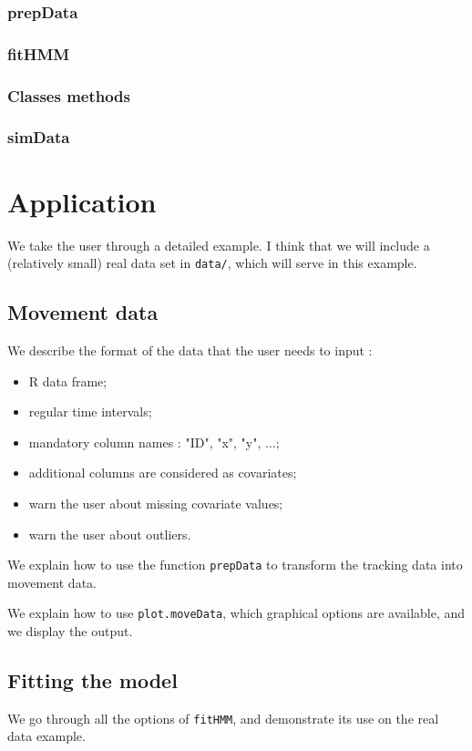 \documentclass[]{article}
\begin{document}
\subsubsection{prepData}

\subsubsection{fitHMM}

\subsubsection{Classes methods}

\subsubsection{simData}

\section{Application} \label{application}
We take the user through a detailed example. I think that we will include a (relatively small) real data set in \texttt{data/}, which will serve in this example.

\subsection{Movement data}
We describe the format of the data that the user needs to input :
\begin{itemize}
	\item R data frame;
	\item regular time intervals;
	\item mandatory column names : "ID", "x", "y", ...;
	\item additional columns are considered as covariates;
	\item warn the user about missing covariate values;
	\item warn the user about outliers.
\end{itemize}

We explain how to use the function \texttt{prepData} to transform the tracking data into movement data.

We explain how to use \texttt{plot.moveData}, which graphical options are available, and we display the output.

\subsection{Fitting the model}
We go through all the options of \texttt{fitHMM}, and demonstrate its use on the real data example.
\end{document}
